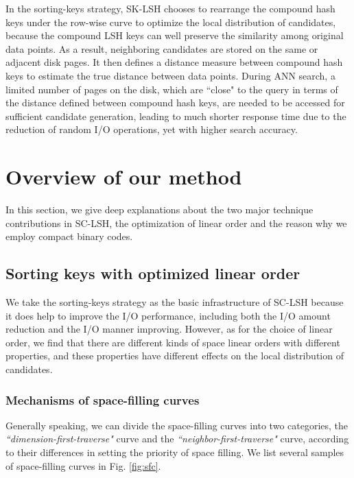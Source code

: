 \documentclass[twocolumn]{svjour3}          %
\begin{document}
In the sorting-keys strategy, SK-LSH chooses to rearrange the compound hash keys under the row-wise curve to optimize the local distribution of candidates, because the compound LSH keys can well preserve the similarity among original data points. As a result, neighboring candidates are stored on the same or adjacent disk pages. It then defines a distance measure between compound hash keys to estimate the true distance between data points. During ANN search, a limited number of pages on the disk, which are ``close" to the query in terms of the distance defined between compound hash keys, are needed to be accessed for sufficient candidate generation, leading to much shorter response time due to the reduction of random I/O operations, yet with higher search accuracy.


\section{Overview of our method}\label{sec:overview}
In this section, we give deep explanations about the two major technique contributions in SC-LSH, the optimization of linear order and the reason why we employ compact binary codes.

\subsection{Sorting keys with optimized linear order}\label{subsec:linearorder}
We take the sorting-keys strategy as the basic infrastructure of SC-LSH because it does help to improve the I/O performance, including both the I/O amount reduction and the I/O manner improving.
However, as for the choice of linear order, we find that there are different kinds of space linear orders with different properties, and these properties have different effects on the local distribution of candidates.

\subsubsection{Mechanisms of space-filling curves}
Generally speaking, we can divide the space-filling curves into two categories, the \emph{``dimension-first-traverse"} curve and the \emph{``neighbor-first-traverse"} curve, according to their differences in setting the priority of space filling. We list several samples of space-filling curves in Fig. \ref{fig:sfc}.
\end{document}
